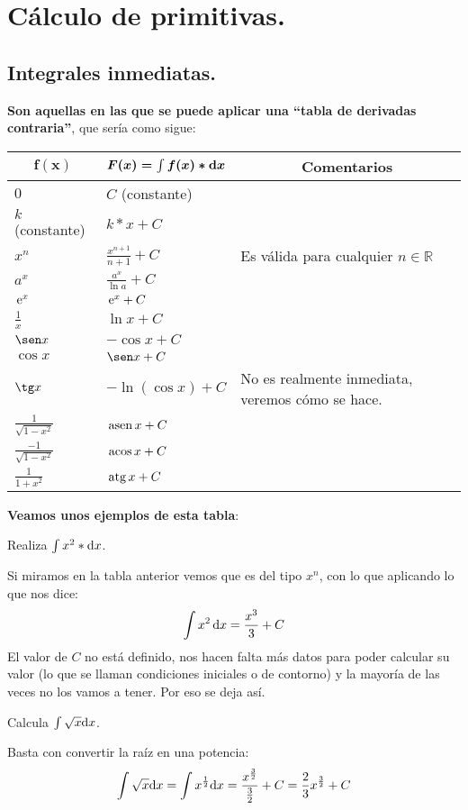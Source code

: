 \documentclass[a4paper,11pt,answers]{exam}
\begin{document}
\section{Cálculo de primitivas.}
\subsection{Integrales inmediatas.}
\textbf{Son aquellas en las que se puede aplicar una ``tabla de derivadas contraria''}, que sería como sigue:
\begin{small}
\begin{center}
\def\arraystretch{2}
\begin{longtable}{|l|l|l|}
\hline
\multicolumn{1}{|c|}{$\boldsymbol{f(x)}$} &\multicolumn{1}{|c|}{$\boldsymbol{F(x) = \int f(x)*\mathrm{d}x}$}&
\multicolumn{1}{|c|}{\textbf{Comentarios}}\\ \hline
\endhead
\hline
\endfoot
$0$&$C$ (constante)&\\ \hline
$k$ (constante)& $k*x +C$&\\ \hline
$x^n$&$\frac{x^{n+1}}{n+1} + C$&Es válida para cualquier $n \in \mathbb{R}$\\ \hline
$a^x$&$\frac{a^x}{\ln a}+ C$&\\ \hline
$\,\mathrm{e}^x$& $\,\mathrm{e}^x+ C$&\\ \hline
$\frac{1}{x}$& $\ln x+ C$&\\ \hline
$\sen x$&$-\cos x+ C$&\\ \hline
$\cos x$& $\sen x+ C$&\\ \hline
$\tg x$& $-\ln (\cos x)+ C$ &No es realmente inmediata, veremos cómo se hace.\\ \hline
$\frac{1}{\sqrt{1-x^2}}$&$\,\mathrm{asen}\, x+ C$&\\ \hline
$\frac{-1}{\sqrt{1-x^2}}$&$\,\mathrm{acos}\, x+ C$&\\ \hline
$\frac{1}{1+x^2}$&$\,\mathrm{atg}\, x+ C$&\\ \hline
\end{longtable}
\end{center}
\end{small}

\textbf{Veamos unos ejemplos de esta tabla}:
\begin{questions}
\question Realiza $\int x^2 * \mathrm{d}x$.
\begin{solution}
Si miramos en la tabla anterior vemos que es del tipo $x^n$, con lo que aplicando lo que nos dice:
\[\int x^2\,\mathrm{d}x =\frac{x^3}{3} + C\]
El valor de $C$ no está definido, nos hacen falta más datos para poder calcular su valor (lo que se llaman condiciones iniciales o de contorno) y la mayoría de las veces no los vamos a tener. Por eso se deja así.
\end{solution}

\question Calcula $\int \sqrt{x} \mathrm{d}x$.
\begin{solution}
Basta con convertir la raíz en una potencia:
\[\int \sqrt{x} \mathrm{d}x = \int x^\frac{1}{2} \mathrm{d}x = \frac{x^\frac{3}{2}}{\frac{3}{2}} + C = \frac{2}{3} x^\frac{3}{2} + C\]
\end{solution}

\end{questions}
\end{document}
